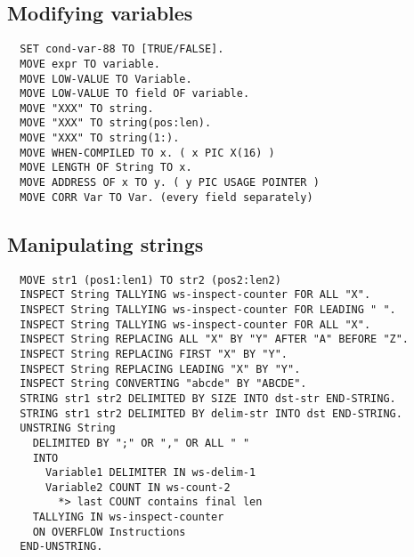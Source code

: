 \documentclass[10pt,landscape]{article}
\begin{document}
\begin{multicols}{3}
{\subsection{Modifying variables}
\begin{verbatim}
  SET cond-var-88 TO [TRUE/FALSE].
  MOVE expr TO variable.
  MOVE LOW-VALUE TO Variable.
  MOVE LOW-VALUE TO field OF variable.
  MOVE "XXX" TO string.
  MOVE "XXX" TO string(pos:len).
  MOVE "XXX" TO string(1:).
  MOVE WHEN-COMPILED TO x. ( x PIC X(16) )
  MOVE LENGTH OF String TO x.
  MOVE ADDRESS OF x TO y. ( y PIC USAGE POINTER )
  MOVE CORR Var TO Var. (every field separately)
\end{verbatim}

\subsection{Manipulating strings}
\begin{verbatim}
  MOVE str1 (pos1:len1) TO str2 (pos2:len2) 
  INSPECT String TALLYING ws-inspect-counter FOR ALL "X".
  INSPECT String TALLYING ws-inspect-counter FOR LEADING " ".
  INSPECT String TALLYING ws-inspect-counter FOR ALL "X".
  INSPECT String REPLACING ALL "X" BY "Y" AFTER "A" BEFORE "Z".
  INSPECT String REPLACING FIRST "X" BY "Y".
  INSPECT String REPLACING LEADING "X" BY "Y".
  INSPECT String CONVERTING "abcde" BY "ABCDE".
  STRING str1 str2 DELIMITED BY SIZE INTO dst-str END-STRING.
  STRING str1 str2 DELIMITED BY delim-str INTO dst END-STRING. 
  UNSTRING String
    DELIMITED BY ";" OR "," OR ALL " "
    INTO
      Variable1 DELIMITER IN ws-delim-1
      Variable2 COUNT IN ws-count-2  
        *> last COUNT contains final len
    TALLYING IN ws-inspect-counter
    ON OVERFLOW Instructions
  END-UNSTRING.
\end{verbatim}
}

\end{multicols}

\newpage

\end{document}
